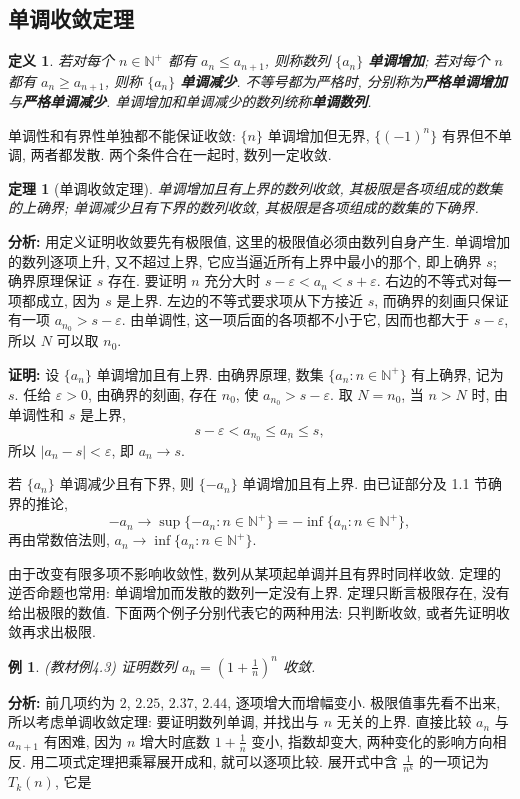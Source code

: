\documentclass[UTF8,openany]{ctexbook}
\theoremstyle{chinesetextbook}
\newtheorem{definition}{定义}[section]
\newtheorem{example}{例}[section]
\newtheorem{theorem}{定理}[section]
\newenvironment{cnproof}{\par\indent\textbf{证明:} \ignorespaces}{\par}
\begin{document}
\subsection{单调收敛定理}
\begin{definition}
若对每个 $n\in\mathbb N^+$ 都有 $a_n\le a_{n+1}$, 则称数列 $\{a_n\}$ \textbf{单调增加}; 若对每个 $n$ 都有 $a_n\ge a_{n+1}$, 则称 $\{a_n\}$ \textbf{单调减少}. 不等号都为严格时, 分别称为\textbf{严格单调增加}与\textbf{严格单调减少}. 单调增加和单调减少的数列统称\textbf{单调数列}.
\end{definition}
单调性和有界性单独都不能保证收敛: $\{n\}$ 单调增加但无界, $\{(-1)^n\}$ 有界但不单调, 两者都发散. 两个条件合在一起时, 数列一定收敛.
\begin{theorem}[单调收敛定理]
单调增加且有上界的数列收敛, 其极限是各项组成的数集的上确界; 单调减少且有下界的数列收敛, 其极限是各项组成的数集的下确界.
\end{theorem}
\par\indent\textbf{分析:} 用定义证明收敛要先有极限值, 这里的极限值必须由数列自身产生. 单调增加的数列逐项上升, 又不超过上界, 它应当逼近所有上界中最小的那个, 即上确界 $s$; 确界原理保证 $s$ 存在. 要证明 $n$ 充分大时 $s-\varepsilon<a_n<s+\varepsilon$. 右边的不等式对每一项都成立, 因为 $s$ 是上界. 左边的不等式要求项从下方接近 $s$, 而确界的刻画只保证有一项 $a_{n_0}>s-\varepsilon$. 由单调性, 这一项后面的各项都不小于它, 因而也都大于 $s-\varepsilon$, 所以 $N$ 可以取 $n_0$.
\begin{cnproof}
设 $\{a_n\}$ 单调增加且有上界. 由确界原理, 数集 $\{a_n:n\in\mathbb N^+\}$ 有上确界, 记为 $s$. 任给 $\varepsilon>0$, 由确界的刻画, 存在 $n_0$, 使 $a_{n_0}>s-\varepsilon$. 取 $N=n_0$, 当 $n>N$ 时, 由单调性和 $s$ 是上界,
\[
s-\varepsilon<a_{n_0}\le a_n\le s,
\]
所以 $|a_n-s|<\varepsilon$, 即 $a_n\to s$.

若 $\{a_n\}$ 单调减少且有下界, 则 $\{-a_n\}$ 单调增加且有上界. 由已证部分及 1.1 节确界的推论,
\[
-a_n\to\sup\{-a_n:n\in\mathbb N^+\}=-\inf\{a_n:n\in\mathbb N^+\},
\]
再由常数倍法则, $a_n\to\inf\{a_n:n\in\mathbb N^+\}$.
\end{cnproof}
由于改变有限多项不影响收敛性, 数列从某项起单调并且有界时同样收敛. 定理的逆否命题也常用: 单调增加而发散的数列一定没有上界. 定理只断言极限存在, 没有给出极限的数值. 下面两个例子分别代表它的两种用法: 只判断收敛, 或者先证明收敛再求出极限.
\begin{example}\label{ex:4-3}
\textnormal{(教材例4.3)} 证明数列 $\displaystyle a_n=\left(1+\frac1n\right)^n$ 收敛.
\end{example}
\par\indent\textbf{分析:} 前几项约为 $2$, $2.25$, $2.37$, $2.44$, 逐项增大而增幅变小. 极限值事先看不出来, 所以考虑单调收敛定理: 要证明数列单调, 并找出与 $n$ 无关的上界. 直接比较 $a_n$ 与 $a_{n+1}$ 有困难, 因为 $n$ 增大时底数 $\displaystyle1+\frac1n$ 变小, 指数却变大, 两种变化的影响方向相反. 用二项式定理把乘幂展开成和, 就可以逐项比较. 展开式中含 $\displaystyle\frac1{n^k}$ 的一项记为 $T_k(n)$, 它是
\end{document}
